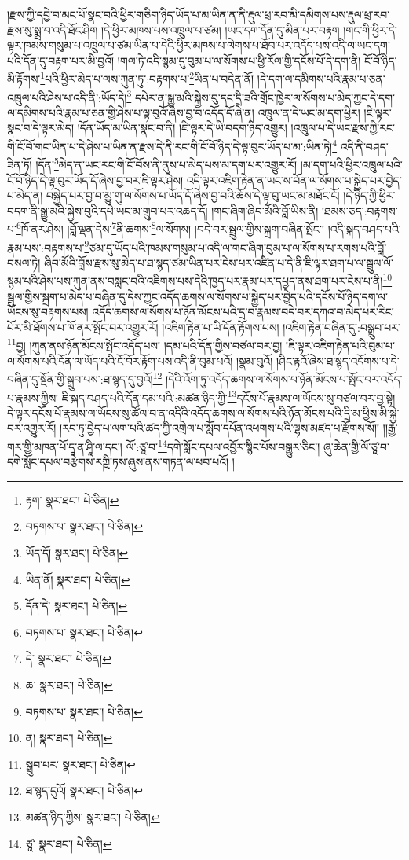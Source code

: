 །རྫས་ཀྱི་དབྱེ་བ་མང་པོ་སྣང་བའི་ཕྱིར་གཅིག་ཉིད་ཡོད་པ་མ་ཡིན་ན་ནི་རྡུལ་ཕྲ་རབ་མི་དམིགས་པས་རྡུལ་ཕྲ་རབ་རྫས་སུ་སྨྲ་བ་འདི་ཐོང་ཤིག །དེ་ཕྱིར་མཁས་པས་འཁྲུལ་པ་ཙམ། །ཡང་དག་དོན་དུ་མིན་པར་བརྟག །གང་གི་ཕྱིར་དེ་ལྟར་ཁམས་གསུམ་པ་འཁྲུལ་པ་ཙམ་ཡིན་པ་དེའི་ཕྱིར་མཁས་པ་ལེགས་པ་ཐོབ་པར་འདོད་པས་འདི་ལ་ཡང་དག་པའི་དོན་དུ་བརྟག་པར་མི་བྱའོ། །གལ་ཏེ་འདི་སྙམ་དུ་བུམ་པ་ལ་སོགས་པ་ཕྱི་རོལ་གྱི་དངོས་པོ་དེ་དག་ནི། ངོ་བོ་ཉིད་མི་རྟོགས་\footnote{རྟག་  སྣར་ཐང་།  པེ་ཅིན། }པའི་ཕྱིར་མེད་པ་ལས་ཀུན་ཏུ་:བརྟགས་པ་\footnote{བཏགས་པ་  སྣར་ཐང་།  པེ་ཅིན། }ཡིན་པ་བདེན་ནོ། །དེ་དག་ལ་དམིགས་པའི་རྣམ་པ་ཅན་འཁྲུལ་པའི་ཤེས་པ་འདི་ནི་:ཡོད་དེ།\footnote{ཡོད་དོ།  སྣར་ཐང་།  པེ་ཅིན། } དཔེར་ན་སྒྱུ་མའི་སྐྱེས་བུ་དང་དྲི་ཟའི་གྲོང་ཁྱེར་ལ་སོགས་པ་མེད་ཀྱང་དེ་དག་ལ་དམིགས་པའི་རྣམ་པ་ཅན་གྱི་ཤེས་པ་ལྟ་བུའོ་ཞེས་བྱ་བ་འདོད་དོ་ཞེ་ན། འཁྲུལ་ན་དེ་ཡང་མ་དག་ཕྱིར། །ཇི་ལྟར་སྣང་བ་དེ་ལྟར་མེད། །དོན་ཡོད་མ་ཡིན་སྣང་བ་ནི། །ཇི་ལྟར་དེ་ཡི་བདག་ཉིད་འགྱུར། །འཁྲུལ་པ་དེ་ཡང་རྫས་ཀྱི་རང་གི་ངོ་བོ་གང་ཡིན་པ་དེ་ཤེས་པ་ཡིན་ན་རྫས་དེ་ནི་རང་གི་ངོ་བོ་ཉིད་དེ་ལྟ་བུར་ཡོད་པ་མ་:ཡིན་ཏེ།\footnote{ཡིན་ནོ།  སྣར་ཐང་།  པེ་ཅིན། } འདི་ནི་བཤད་ཟིན་ཏོ། །དོན་\footnote{དོན་དེ་  སྣར་ཐང་།  པེ་ཅིན། }མེད་ན་ཡང་རང་གི་ངོ་བོས་ནི་ནུས་པ་མེད་པས་མ་དག་པར་འགྱུར་རོ། །མ་དག་པའི་ཕྱིར་འཁྲུལ་པའི་ངོ་བོ་ཉིད་དེ་ལྟ་བུར་ཡོད་དོ་ཞེས་བྱ་བར་ཇི་ལྟར་ཤེས། འདི་ལྟར་འཇིག་རྟེན་ན་ཡང་ས་བོན་ལ་སོགས་པ་སྐྱེད་པར་བྱེད་པ་མེད་ན། བསྐྱེད་པར་བྱ་བ་མྱུ་གུ་ལ་སོགས་པ་ཡོད་དོ་ཞེས་བྱ་བའི་ཆོས་དེ་ལྟ་བུ་ཡང་མ་མཐོང་ངོ། །དེ་ཉིད་ཀྱི་ཕྱིར་བདག་ནི་སྒྱུ་མའི་སྐྱེས་བུའི་དཔེ་ཡང་མ་གྲུབ་པར་འཆད་དོ། །གང་ཞིག་ཞིབ་མོའི་བློ་ཡིས་ནི། །ཐམས་ཅད་:བརྟགས་པ་\footnote{བཏགས་པ་  སྣར་ཐང་།  པེ་ཅིན། }ཁོ་ནར་ཤེས། །བློ་ལྡན་དེས་\footnote{དེ་  སྣར་ཐང་།  པེ་ཅིན། }ནི་ཆགས་\footnote{ཆ་  སྣར་ཐང་།  པེ་ཅིན། }ལ་སོགས། །བདེ་བར་སྦྲུལ་གྱིས་སྐྲག་བཞིན་སྤོང་། །འདི་སྐད་བཤད་པའི་རྣམ་པས་:བརྟགས་པ་\footnote{བཏགས་པ་  སྣར་ཐང་།  པེ་ཅིན། }ཙམ་དུ་ཡོད་པའི་ཁམས་གསུམ་པ་འདི་ལ་གང་ཞིག་བུམ་པ་ལ་སོགས་པ་རགས་པའི་བློ་བསལ་ཏེ། ཞིབ་མོའི་བློས་རྫས་སུ་མེད་པ་ཐ་སྙད་ཙམ་ཡིན་པར་ངེས་པར་འཛིན་པ་དེ་ནི་ཇི་ལྟར་ཐག་པ་ལ་སྦྲུལ་ལོ་སྙམ་པའི་ཤེས་པས་ཀུན་ནས་བསླང་བའི་འཇིགས་པས་དེའི་ཁྱད་པར་རྣམ་པར་དཔྱད་ནས་ཐག་པར་ངེས་པ་ནི།\footnote{ན།  སྣར་ཐང་།  པེ་ཅིན། } སྦྲུལ་གྱིས་སྐྲག་པ་མེད་པ་བཞིན་དུ་དེས་ཀྱང་འདོད་ཆགས་ལ་སོགས་པ་སྐྱེད་པར་བྱེད་པའི་དངོས་པོ་ཉིད་དག་ལ་ཡོངས་སུ་བརྟགས་པས། འདོད་ཆགས་ལ་སོགས་པ་ཉོན་མོངས་པའི་དྲ་བ་རྣམས་བདེ་བར་དཀའ་བ་མེད་པར་རིང་པོར་མི་ཐོགས་པ་ཁོ་ནར་སྤོང་བར་འགྱུར་རོ། །འཇིག་རྟེན་པ་ཡི་དོན་རྟོགས་པས། །འཇིག་རྟེན་བཞིན་དུ་:བསྒྲུབ་པར་\footnote{སྒྲུབ་པར་  སྣར་ཐང་།  པེ་ཅིན། }བྱ། །ཀུན་ནས་ཉོན་མོངས་སྤོང་འདོད་པས། །དམ་པའི་དོན་གྱིས་བཙལ་བར་བྱ། །ཇི་ལྟར་འཇིག་རྟེན་པའི་བུམ་པ་ལ་སོགས་པའི་དོན་ལ་ཡོད་པའི་ངོ་བོར་རྟོག་པས་འདི་ནི་བུམ་པའོ། །སྣམ་བུའོ། །ཤིང་རྟའོ་ཞེས་ཐ་སྙད་འདོགས་པ་དེ་བཞིན་དུ་སྔོན་གྱི་སྒྲུབ་པས་:ཐ་སྙད་དུ་བྱའོ།\footnote{ཐ་སྙད་དུའོ།  སྣར་ཐང་།  པེ་ཅིན། } །དེའི་འོག་ཏུ་འདོད་ཆགས་ལ་སོགས་པ་ཉོན་མོངས་པ་སྤོང་བར་འདོད་པ་རྣམས་ཀྱིས། ཇི་སྐད་བཤད་པའི་དོན་དམ་པའི་:མཚན་ཉིད་ཀྱི་\footnote{མཚན་ཉིད་ཀྱིས་  སྣར་ཐང་།  པེ་ཅིན། }དངོས་པོ་རྣམས་ལ་ཡོངས་སུ་བཙལ་བར་བྱ་སྟེ། དེ་ལྟར་དངོས་པོ་རྣམས་ལ་ཡོངས་སུ་ཚོལ་བ་ན་འདིའི་འདོད་ཆགས་ལ་སོགས་པའི་ཉོན་མོངས་པའི་དྲི་མ་ཕྱིས་མི་སྐྱེ་བར་འགྱུར་རོ། །རབ་ཏུ་བྱེད་པ་ལག་པའི་ཚད་ཀྱི་འགྲེལ་པ་སློབ་དཔོན་འཕགས་པའི་ལྷས་མཛད་པ་རྫོགས་སོ།། །།རྒྱ་གར་གྱི་མཁན་པོ་དཱ་ན་ཤཱི་ལ་དང་། ལོ་:ཙཱ་བ་\footnote{ཙཱ་  སྣར་ཐང་།  པེ་ཅིན། }དགེ་སློང་དཔལ་འབྱོར་སྙིང་པོས་བསྒྱུར་ཅིང་། ཞུ་ཆེན་གྱི་ལོ་ཙཱ་བ་དགེ་སློང་དཔལ་བརྩེགས་རཀྵི་ཏས་ཞུས་ནས་གཏན་ལ་ཕབ་པའོ། ། 